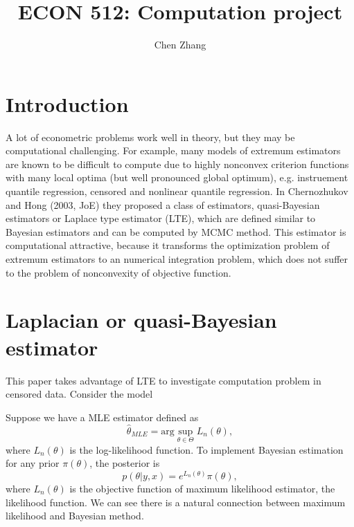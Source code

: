 \documentclass[12pt]{article}
\theoremstyle{plain} \newtheorem{theorem}{Theorem}
\theoremstyle{definition} \newtheorem{definition}{Definition}
\begin{document}
\title{ECON 512: Computation project}
\author{Chen Zhang}
\maketitle



\section{Introduction}

\label{intro}

A lot of econometric problems work well in theory, but they may be
computational challenging. For example, many models of extremum
estimators are known to be difficult to compute due to highly
nonconvex criterion functions with many local optima (but well
pronounced global optimum), e.g. instruement quantile regression,
censored and nonlinear quantile regression. In Chernozhukov and Hong
(2003, JoE) they proposed a class of estimators, quasi-Bayesian
estimators or Laplace type estimator (LTE), which are defined similar
to Bayesian estimators and can be computed by MCMC method. This
estimator is computational attractive, because it transforms the
optimization problem of extremum estimators to an numerical
integration problem, which does not suffer to the problem of
nonconvexity of objective function.

\section{Laplacian or quasi-Bayesian estimator}
This paper takes advantage of LTE to investigate computation problem
in censored data. Consider the model

Suppose we have a MLE estimator defined as
\begin{equation*}
    \hat{\theta}_{MLE} = \mathrm{arg}\sup_{\theta\in\Theta}L_n(\theta),
\end{equation*}
where $L_n(\theta)$ is the log-likelihood function.  To implement
Bayesian estimation for any prior $\pi(\theta)$, the posterior is
\begin{equation*}
    p(\theta |y,x)  =  e^{L_n(\theta)}\pi(\theta),
\end{equation*}
where $L_n(\theta)$ is the objective function of maximum likelihood
estimator, the likelihood function. We can see there is a natural
connection between maximum likelihood and Bayesian method.
\end{document}
